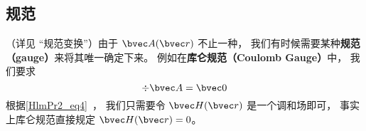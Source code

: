 \subsection{规范}
（详见 “规范变换”）由于 $\bvec A(\bvec r)$ 不止一种， 我们有时候需要某种\textbf{规范（gauge）}来将其唯一确定下来。 例如在\textbf{库仑规范（Coulomb Gauge）}中， 我们要求
\begin{equation}
\div \bvec A = \bvec 0
\end{equation}
根据\autoref{HlmPr2_eq4}~， 我们只需要令 $\bvec H(\bvec r)$ 是一个调和场即可， 事实上库仑规范直接规定 $\bvec H(\bvec r) = 0$。
